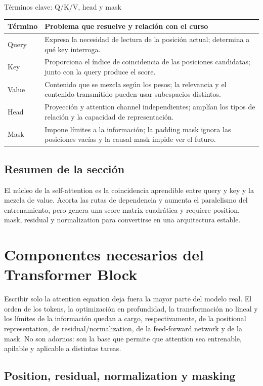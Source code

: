 \documentclass[a4paper]{article}
\begin{document}
\begin{knowledgebox}{Términos clave: Q/K/V, head y mask}
\begin{tabularx}{\textwidth}{L{0.18\textwidth} X}
\toprule
Término & Problema que resuelve y relación con el curso \\
\midrule
Query & Expresa la necesidad de lectura de la posición actual; determina a qué key interroga. \\
Key & Proporciona el índice de coincidencia de las posiciones candidatas; junto con la query produce el score. \\
Value & Contenido que se mezcla según los pesos; la relevancia y el contenido transmitido pueden usar subespacios distintos. \\
Head & Proyección y attention channel independientes; amplían los tipos de relación y la capacidad de representación. \\
Mask & Impone límites a la información; la padding mask ignora las posiciones vacías y la causal mask impide ver el futuro. \\
\bottomrule
\end{tabularx}
\end{knowledgebox}

\subsection{Resumen de la sección}

El núcleo de la self-attention es la coincidencia aprendible entre query y key y la mezcla de value. Acorta las rutas de dependencia y aumenta el paralelismo del entrenamiento, pero genera una score matrix cuadrática y requiere position, mask, residual y normalization para convertirse en una arquitectura estable.
\section{Componentes necesarios del Transformer Block}

Escribir solo la attention equation deja fuera la mayor parte del modelo real. El orden de los tokens, la optimización en profundidad, la transformación no lineal y los límites de la información quedan a cargo, respectivamente, de la positional representation, de residual/normalization, de la feed-forward network y de la mask. No son adornos: son la base que permite que attention sea entrenable, apilable y aplicable a distintas tareas.

\subsection{Position, residual, normalization y masking}
\end{document}
